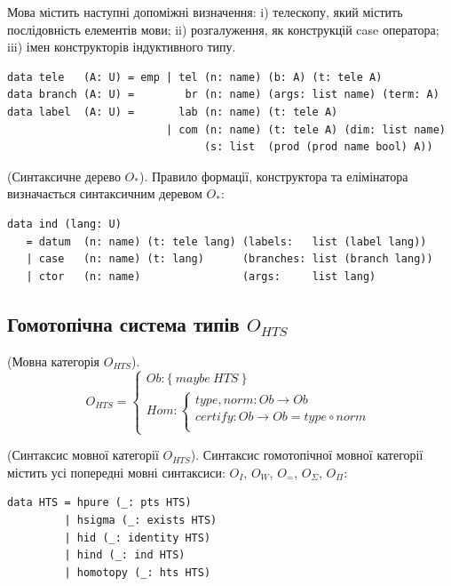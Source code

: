 Мова містить наступні допоміжні визначення: i) телескопу,
який містить послідовність елементів мови; ii) розгалуження,
як конструкцій case оператора; iii) імен конструкторів індуктивного типу.

\begin{lstlisting}
data tele   (A: U) = emp | tel (n: name) (b: A) (t: tele A)
data branch (A: U) =        br (n: name) (args: list name) (term: A)
data label  (A: U) =       lab (n: name) (t: tele A)
                         | com (n: name) (t: tele A) (dim: list name)
                               (s: list  (prod (prod name bool) A))
\end{lstlisting}

\begin{definition} (Синтаксичне дерево $O_*$).
Правило формації, конструктора та елімінатора визначається синтаксичним деревом $O_*$:
\begin{lstlisting}
data ind (lang: U)
   = datum  (n: name) (t: tele lang) (labels:   list (label lang))
   | case   (n: name) (t: lang)      (branches: list (branch lang))
   | ctor   (n: name)                (args:     list lang)
\end{lstlisting}
\end{definition}

\subsection{Гомотопічна система типів $O_{HTS}$}

\begin{definition} (Мовна категорія $O_{HTS}$).
$$
O_{HTS} =
\begin{cases}
Ob: \{\ maybe\ HTS\ \} \\
Hom: \begin{cases}
type,norm: Ob \rightarrow Ob \\
certify: Ob \rightarrow Ob = type \circ norm \\
\end{cases}
\end{cases}
$$
\end{definition}

\begin{definition} (Синтаксис мовної категорії $O_{HTS}$).
Синтаксис гомотопічної мовної категорії містить усі
попередні мовні синтаксиси: $O_I$, $O_W$, $O_=$, $O_\Sigma$, $O_\Pi$:
\begin{lstlisting}
data HTS = hpure (_: pts HTS)
         | hsigma (_: exists HTS)
         | hid (_: identity HTS)
         | hind (_: ind HTS)
         | homotopy (_: hts HTS)
\end{lstlisting}
\end{definition}

